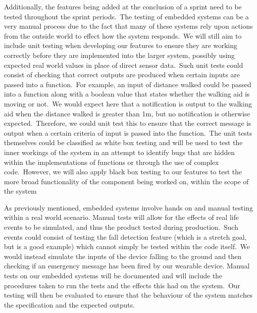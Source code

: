         Additionally, the features being added at the conclusion of a sprint need to be tested throughout the sprint
        periods.\ The testing of embedded systems can be a very manual process due to the fact that many of these systems
        rely upon actions from the outside world to effect how the system responds.\ We will still aim to include unit
        testing when developing our features to ensure they are working correctly before they are implemented into the
        larger system, possibly using expected real world values in place of direct sensor data.\ Such unit tests could
        consist of checking that correct outputs are produced when certain inputs are passed into a function.\ For
        example, an input of distance walked could be passed into a function along with a boolean value that states
        whether the walking aid is moving or not.\ We would expect here that a notification is output to the walking aid
        when the distance walked is greater than 1m, but no notification is otherwise expected.\ Therefore, we could unit
        test this to ensure that the correct message is output when a certain criteria of input is passed into the
        function.\ The unit tests themselves could be classified as white box testing and will be used to test the inner
        workings of the system in an attempt to identify bugs that are hidden within the implementations of functions or
        through the use of complex code.\ However, we will also apply black box testing to our features to test the more
        broad functionality of the component being worked on, within the scope of the system

        As previously mentioned, embedded systems involve hands on and manual testing within a real world scenario.
        Manual tests will allow for the effects of real life events to be simulated, and thus the product tested during
        production.\ Such events could consist of testing the fall detection feature (which is a stretch goal, but is a
        good example) which cannot simply be tested within the code itself.\ We would instead simulate the inputs of the
        device falling to the ground and then checking if an emergency message has been fired by our wearable device.
        Manual tests on our embedded systems will be documented and will include the procedures taken to run the tests
        and the effects this had on the system.\ Our testing will then be evaluated to ensure that the behaviour of the
        system matches the specification and the expected outputs.
